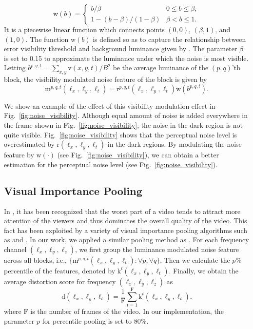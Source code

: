 \documentclass{sig-alternate}
\begin{document}
\begin{equation}
\label{eq:brightness}
\mathrm{w}(b) = \begin{cases}
b/\beta & 0\leq b\leq\beta,\\
1-(b-\beta)/(1-\beta) & \beta<b\leq1.
\end{cases}
\end{equation}
It is a piecewise linear function which connects points $(0,0)$, $(\beta,1)$, and $(1,0)$. The function $\mathrm{w}(b)$ is defined so as to capture the relationship between error visibility threshold and background luminance given by \cite{ChoLi1995}. The parameter $\beta$ is set to 0.15 to approximate the luminance under which the noise is most visible. Letting $b^{p,q,t}=\sum_{x,y}{\mathrm{v}(x,y,t)}/B^2$ be the average luminance of the $(p,q)$'th block, the visibility modulated noise feature of the block is given by
\begin{equation}
\label{eq:brightness_feature}
\mathrm{m}^{p,q,t}(\ell_x,\ell_y,\ell_t) = \mathrm{r}^{p,q,t}\left(\ell_x,\ell_y,\ell_t\right)\mathrm{w}\left(b^{p,q,t}\right).
\end{equation}

We show an example of the effect of this visibility modulation effect in Fig.~\ref{fig:noise_visibility}. Although equal amount of noise is added everywhere in the frame shown in Fig.~\ref{fig:noise_visibility}, the noise in the dark region is not quite visible. Fig.~\ref{fig:noise_visibility} shows that the perceptual noise level is overestimated by $\mathrm{r}(\ell_x,\ell_y,\ell_t)$ in the dark regions. By modulating the noise feature by $\mathrm{w}(\cdot)$ (see Fig.~\ref{fig:noise_visibility}), we can obtain a better estimation for the perceptual noise level (see Fig.~\ref{fig:noise_visibility}).


\subsection{Visual Importance Pooling}
In \cite{MooBov2009,ParSesLeeBov2013}, it has been recognized that the worst part of a video tends to attract more attention of the viewers and thus dominates the overall quality of the video. This fact has been exploited by a variety of visual importance pooling algorithms such as \cite{MooBov2009} and \cite{PinWol2004}. In our work, we applied a similar pooling method as \cite{MooBov2009}. For each frequency channel $(\ell_x,\ell_y,\ell_z)$, we first group the luminance modulated noise feature across all blocks, i.e., $\{\mathrm{m}^{p,q,t}(\ell_x,\ell_y,\ell_t): \forall p, \forall q\}$. Then we calculate the $p\%$ percentile of the features, denoted by $\mathrm{k}^{t}(\ell_x,\ell_y,\ell_t)$. Finally, we obtain the average distortion score for frequency $(\ell_x,\ell_y,\ell_z)$ as 
\begin{equation}
\mathrm{d}(\ell_x,\ell_y,\ell_t) = \frac{1}{\mathrm{F}}\sum_{t=1}^\mathrm{F}{\mathrm{k}^{t}(\ell_x,\ell_y,\ell_t)}. 
\end{equation}
where $\mathrm{F}$ is the number of frames of the video. In our implementation, the parameter $p$ for percentile pooling is set to 80\%.
\end{document}
